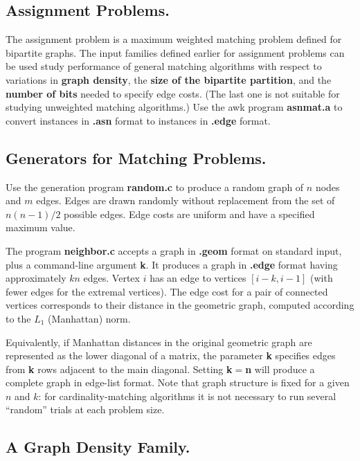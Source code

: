 \subsection{Assignment Problems.}

The assignment problem is a maximum weighted matching problem defined
for bipartite graphs.  The input families defined earlier for
assignment problems can be used study performance of general matching
algorithms with respect to variations in {\bf graph density}, the 
{\bf size of the bipartite partition}, and the {\bf number of bits} 
needed to specify edge costs.  (The last one is
not suitable for studying unweighted matching algorithms.) 
Use the awk program {\bf asnmat.a} to convert instances in {\bf .asn}
format to instances in {\bf .edge} format.

\subsection{Generators for Matching Problems.} 

Use the generation program {\bf random.c} to produce a random graph of
$n$ nodes and $m$ edges.  Edges are drawn randomly without
replacement from the set of $n(n-1)/2$ possible edges.  Edge costs are
uniform and have a specified maximum value.  

The program {\bf neighbor.c} accepts a graph in {\bf .geom} format on
standard input, plus a command-line argument {\bf k}.  It produces a
graph in {\bf .edge} format having approximately $kn$ edges.  Vertex
$i$ has an edge to vertices $[i-k, i-1]$ (with fewer edges for the
extremal vertices).   The edge cost for a pair of connected
vertices corresponds to their distance in the geometric graph,
computed according to the $L_1$ (Manhattan) norm.

Equivalently, if Manhattan distances in the original geometric graph
are represented as the lower diagonal of a matrix, the parameter {\bf
k} specifies edges from {\bf k} rows adjacent to the main
diagonal.  Setting {\bf k}$=${\bf n} will produce a complete graph in
edge-list format.  Note that graph structure is fixed for a given $n$
and $k$: for cardinality-matching algorithms it is not necessary 
to run several ``random'' trials at each problem size.  

\subsection{A Graph Density Family.}


